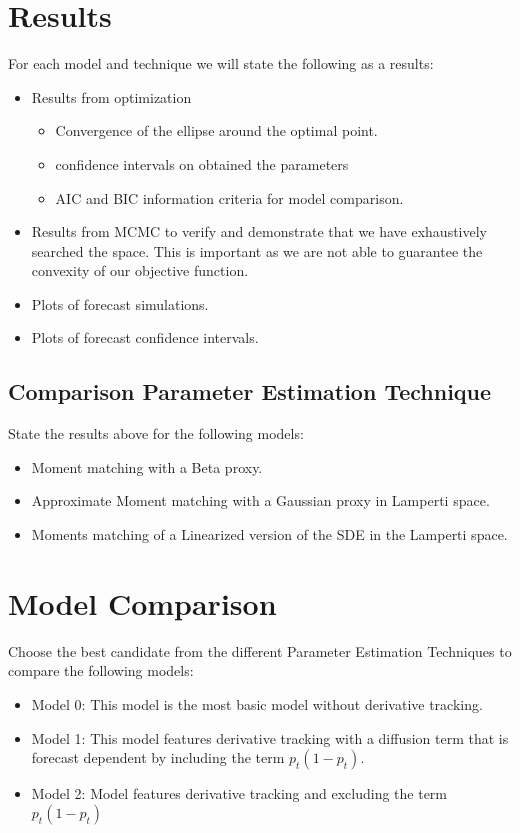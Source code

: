 \documentclass[10pt,twocolumn,letterpaper]{article}
\begin{document}
\section{Results}
For each model and technique we will state the following as a results:
\begin{itemize}
    \item Results from optimization
    \begin{itemize}
        \item Convergence of the ellipse around the optimal point.
        \item confidence intervals on obtained the parameters
        \item AIC and BIC information criteria for model comparison.
    \end{itemize}
    \item Results from MCMC to verify and demonstrate that we have exhaustively searched the space. This is important as we are not able to guarantee the convexity of our objective function.
    \item Plots of forecast simulations.
    \item Plots of forecast confidence intervals.
\end{itemize}


\subsection{ Comparison Parameter Estimation Technique}
State the results above for the following models:
\begin{itemize}
    \item  Moment matching with a Beta proxy.
    \item Approximate Moment matching  with a Gaussian proxy in Lamperti space.
    \item Moments matching of a Linearized version of the SDE in the Lamperti space.
\end{itemize}

\section{Model Comparison}
Choose the best candidate from the different Parameter Estimation Techniques to compare the following models:
\begin{itemize}
  \item Model 0: This model is the most basic model without derivative tracking.

  \item Model 1: This model features derivative tracking with a diffusion term that is forecast dependent by including the term $p_t(1-p_t)$.

  \item Model 2:  Model features derivative tracking and excluding the term $p_t(1-p_t)$
\end{itemize}
\end{document}
